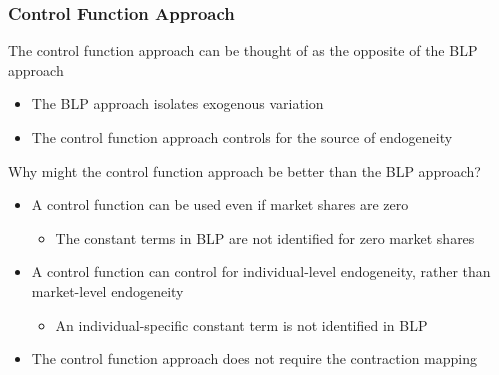 \documentclass{beamer}
\begin{document}
\begin{frame}\frametitle{Control Function Approach}
    The control function approach can be thought of as the opposite of the BLP approach
    \begin{itemize}
        \item The BLP approach isolates exogenous variation
        \item The control function approach controls for the source of endogeneity
    \end{itemize}
    \vspace{3ex}
    Why might the control function approach be better than the BLP approach?
    \begin{itemize}
        \item A control function can be used even if market shares are zero
        \begin{itemize}
            \item The constant terms in BLP are not identified for zero market shares
        \end{itemize}
        \item A control function can control for individual-level endogeneity, rather than market-level endogeneity
        \begin{itemize}
            \item An individual-specific constant term is not identified in BLP
        \end{itemize}
        \item The control function approach does not require the contraction mapping
    \end{itemize}
\end{frame}
\end{document}
